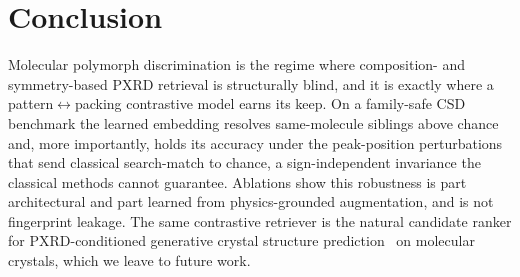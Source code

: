 \documentclass[conference]{IEEEtran}
\begin{document}
\section{Conclusion}
Molecular polymorph discrimination is the regime where composition- and
symmetry-based PXRD retrieval is structurally blind, and it is exactly where a
pattern$\leftrightarrow$packing contrastive model earns its keep. On a
family-safe CSD benchmark the learned embedding resolves same-molecule siblings
above chance and, more importantly, holds its accuracy under the peak-position
perturbations that send classical search-match to chance, a sign-independent
invariance the classical methods cannot guarantee. Ablations show this robustness
is part architectural and part learned from physics-grounded augmentation, and is
not fingerprint leakage. The same contrastive retriever is the natural candidate
ranker for PXRD-conditioned generative crystal structure
prediction~\cite{lai2025xtalnet,johansen2025decifer} on molecular crystals, which
we leave to future work.



\end{document}
